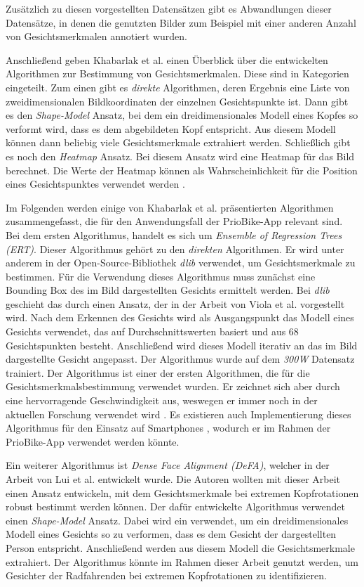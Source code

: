 Zusätzlich zu diesen vorgestellten Datensätzen gibt es Abwandlungen dieser Datensätze, in denen die genutzten Bilder zum Beispiel mit einer anderen Anzahl von Gesichtsmerkmalen annotiert wurden.

Anschließend geben Khabarlak et al. einen Überblick über die entwickelten Algorithmen zur Bestimmung von Gesichtsmerkmalen. Diese sind in Kategorien eingeteilt. Zum einen gibt es \textit{direkte} Algorithmen, deren Ergebnis eine Liste von zweidimensionalen Bildkoordinaten der einzelnen Gesichtspunkte ist. Dann gibt es den \textit{Shape-Model} Ansatz, bei dem ein dreidimensionales Modell eines Kopfes so verformt wird, dass es dem abgebildeten Kopf entspricht. Aus diesem Modell können dann beliebig viele Gesichtsmerkmale extrahiert werden. Schließlich gibt es noch den \textit{Heatmap} Ansatz. Bei diesem Ansatz wird eine Heatmap für das Bild berechnet. Die Werte der Heatmap können als Wahrscheinlichkeit für die Position eines Gesichtspunktes verwendet werden \cite{paper:face:survey}. 

Im Folgenden werden einige von Khabarlak et al. präsentierten Algorithmen zusammengefasst, die für den Anwendungsfall der PrioBike-App relevant sind. Bei dem ersten Algorithmus, handelt es sich um \textit{Ensemble of Regression Trees (ERT)}. Dieser Algorithmus gehört zu den \textit{direkten} Algorithmen. Er wird unter anderem in der Open-Source-Bibliothek \textit{dlib} \cite{paper:dlib:main, paper:dlib} verwendet, um Gesichtsmerkmale zu bestimmen. Für die Verwendung dieses Algorithmus muss zunächst eine Bounding Box des im Bild dargestellten Gesichts ermittelt werden. Bei \textit{dlib} geschieht das durch einen Ansatz, der in der Arbeit von Viola et al. \cite{paper:dlib:face} vorgestellt wird. Nach dem Erkennen des Gesichts wird als Ausgangspunkt das Modell eines Gesichts verwendet, das auf Durchschnittswerten basiert und aus 68 Gesichtspunkten besteht. Anschließend wird dieses Modell iterativ an das im Bild dargestellte Gesicht angepasst. Der Algorithmus wurde auf dem \textit{300W} Datensatz trainiert. Der Algorithmus ist einer der ersten Algorithmen, die für die Gesichtsmerkmalsbestimmung verwendet wurden. Er zeichnet sich aber durch eine hervorragende Geschwindigkeit aus, weswegen er immer noch in der aktuellen Forschung verwendet wird \cite{paper:face:survey}. Es existieren auch Implementierung dieses Algorithmus für den Einsatz auf Smartphones \cite{paper:face:survey}, wodurch er im Rahmen der PrioBike-App verwendet werden könnte. 

Ein weiterer Algorithmus ist \textit{Dense Face Alignment (DeFA)}, welcher in der Arbeit von Lui et al. \cite{paper:defa} entwickelt wurde. Die Autoren wollten mit dieser Arbeit einen Ansatz entwickeln, mit dem Gesichtsmerkmale bei extremen Kopfrotationen robust bestimmt werden können. Der dafür entwickelte Algorithmus verwendet einen \textit{Shape-Model} Ansatz. Dabei wird ein \cnn verwendet, um ein dreidimensionales Modell eines Gesichts so zu verformen, dass es dem Gesicht der dargestellten Person entspricht. Anschließend werden aus diesem Modell die Gesichtsmerkmale extrahiert. Der Algorithmus könnte im Rahmen dieser Arbeit genutzt werden, um Gesichter der Radfahrenden bei extremen Kopfrotationen zu identifizieren.

